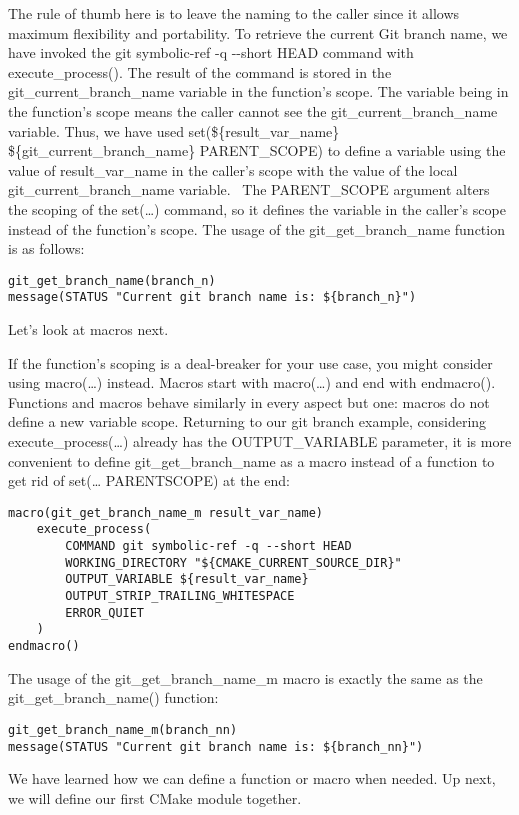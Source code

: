 The rule of thumb here is to leave the naming to the caller since it allows maximum flexibility and portability. To retrieve the current Git branch name, we have invoked the git symbolic-ref -q -{}-short HEAD command with execute\_process(). The result of the command is stored in the git\_current\_branch\_name variable in the function's scope. The variable being in the function's scope means the caller cannot see the git\_current\_branch\_name variable. Thus, we have used set(\$\{result\_var\_name\} \$\{git\_current\_branch\_name\} PARENT\_SCOPE) to define a variable using the value of result\_var\_name in the caller's scope with the value of the local git\_current\_branch\_name variable.
\
The PARENT\_SCOPE argument alters the scoping of the set(…) command, so it defines the variable in the caller's scope instead of the function's scope. The usage of the git\_get\_branch\_name function is as follows:

\begin{lstlisting}[style=styleCMake]
git_get_branch_name(branch_n)
message(STATUS "Current git branch name is: ${branch_n}")
\end{lstlisting}

Let's look at macros next.


If the function's scoping is a deal-breaker for your use case, you might consider using macro(…) instead. Macros start with macro(…) and end with endmacro(). Functions and macros behave similarly in every aspect but one: macros do not define a new variable scope. Returning to our git branch example, considering execute\_process(…) already has the OUTPUT\_VARIABLE parameter, it is more convenient to define git\_get\_branch\_name as a macro instead of a function to get rid of set(… PARENTSCOPE) at the end:

\begin{lstlisting}[style=styleCMake]
macro(git_get_branch_name_m result_var_name)
	execute_process(
		COMMAND git symbolic-ref -q --short HEAD
		WORKING_DIRECTORY "${CMAKE_CURRENT_SOURCE_DIR}"
		OUTPUT_VARIABLE ${result_var_name}
		OUTPUT_STRIP_TRAILING_WHITESPACE
		ERROR_QUIET
	)
endmacro()
\end{lstlisting}

The usage of the git\_get\_branch\_name\_m macro is exactly the same as the git\_get\_branch\_name() function:

\begin{lstlisting}[style=styleCMake]
git_get_branch_name_m(branch_nn)
message(STATUS "Current git branch name is: ${branch_nn}")
\end{lstlisting}

We have learned how we can define a function or macro when needed. Up next, we will define our first CMake module together.


